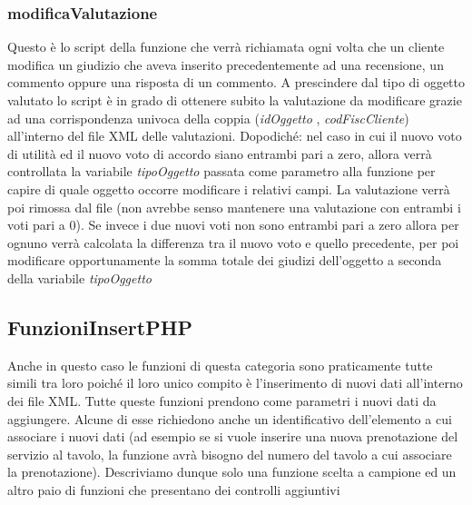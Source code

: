 \documentclass [a4paper, 12pt]{book}
\begin{document}
 
\subsubsection{modificaValutazione}
Questo è lo script della funzione che verrà richiamata ogni volta che un cliente modifica un giudizio che aveva inserito precedentemente ad una recensione, un commento oppure una risposta di un commento. A prescindere dal tipo di oggetto valutato lo script è in grado di ottenere subito la valutazione da modificare grazie ad una corrispondenza univoca della coppia (\textit{idOggetto} , \textit{codFiscCliente}) all'interno del file XML delle valutazioni. Dopodiché: nel caso in cui il nuovo voto di utilità ed il nuovo voto di accordo siano entrambi pari a zero, allora verrà controllata la variabile \textit{tipoOggetto} passata come parametro alla funzione per capire di quale oggetto occorre modificare i relativi campi. La valutazione verrà poi rimossa dal file (non avrebbe senso mantenere una valutazione con entrambi i voti pari a 0). Se invece i due nuovi voti non sono entrambi pari a zero allora per ognuno verrà calcolata la differenza tra il nuovo voto e quello precedente, per poi modificare opportunamente la somma totale dei giudizi dell'oggetto a seconda della variabile \textit{tipoOggetto}

\subsection{FunzioniInsertPHP}
Anche in questo caso le funzioni di questa categoria sono praticamente tutte simili tra loro poiché il loro unico compito è l'inserimento di nuovi dati all'interno dei file XML. Tutte queste funzioni prendono come parametri i nuovi dati da aggiungere. Alcune di esse richiedono anche un identificativo dell'elemento a cui associare i nuovi dati (ad esempio se si vuole inserire una nuova prenotazione del servizio al tavolo, la funzione avrà bisogno del numero del tavolo a cui associare la prenotazione). Descriviamo dunque solo una funzione scelta a campione ed un altro paio di funzioni che presentano dei controlli aggiuntivi
\end{document}
